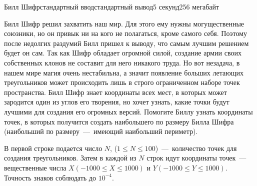 \begin{problem}{Билл Шифр}{стандартный ввод}{стандартный вывод}{5 секунд}{256 мегабайт}
\begin{figure}[h]
\begin{minipage}[h]{0.3\linewidth}
\end{minipage}
\begin{minipage}[h]{0.3\linewidth}
\end{minipage}
\end{figure}


Билл Шифр решил захватить наш мир. Для этого ему нужны могущественные союзники, но он привык ни на кого не полагаться, кроме самого себя. Поэтому после недолгих раздумий Билл пришел к выводу, что самым лучшим решением будет он сам. Так как Шифр обладает огромной силой, создание армии своих собственных клонов не составит для него никакого труда. Но вот незадача, в нашем мире магия очень нестабильна, а значит появление больших летающих треугольников может происходить лишь в строго ограниченном наборе точек пространства. Билл Шифр знает координаты всех мест, в которых может зародится один из углов его творения, но хочет узнать, какие точки будут лучшими для создания его огромных версий. Помогите Биллу узнать координаты точек, в которых получится создать наибольшего по размеру Билла Шифра (наибольший по размеру~---~имеющий наибольший периметр). 

\InputFile
В первой строке подается число  $N$, ($1 \le N \le 100$)~---~количество точек для создания треугольников. Затем в каждой из $N$ строк идут координаты точек~---~ вещественные числа $X(-1000 \le X \le 1000)$ и $Y(-1000 \le Y \le 1000)$. Точность знаков соблюдать до $10^{-4}$.


\end{problem}

